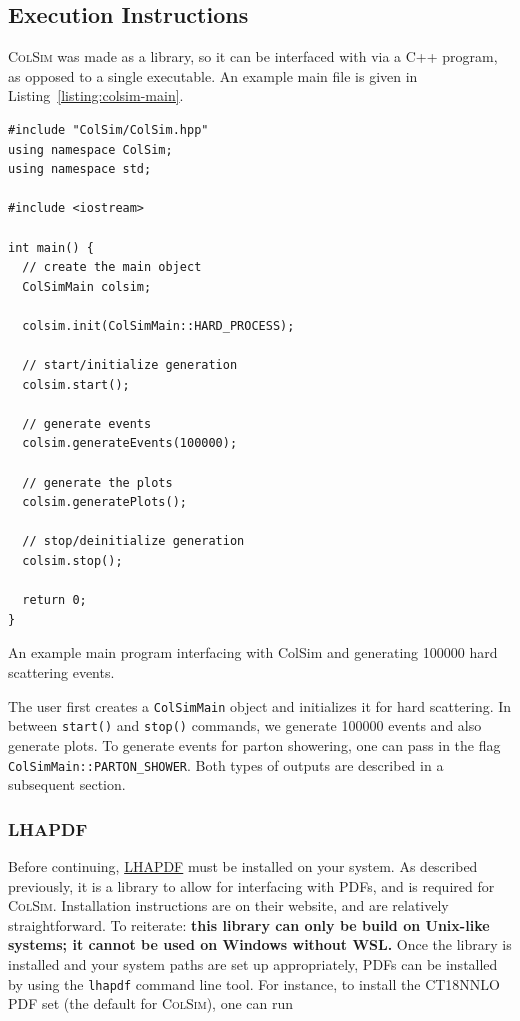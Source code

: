 \subsection{Execution Instructions}

\textsc{ColSim} was made as a library, so it can be interfaced with via a C++ program, as opposed to a single executable. An example main file is given in Listing~\ref{listing:colsim-main}.

\begin{listing}[!ht]
\begin{verbatim}
#include "ColSim/ColSim.hpp"
using namespace ColSim;
using namespace std;

#include <iostream>

int main() {
  // create the main object
  ColSimMain colsim;

  colsim.init(ColSimMain::HARD_PROCESS);

  // start/initialize generation
  colsim.start();

  // generate events
  colsim.generateEvents(100000);
	
  // generate the plots
  colsim.generatePlots();

  // stop/deinitialize generation
  colsim.stop();
    
  return 0;
}
\end{verbatim}
\caption{An example main program interfacing with ColSim and generating 100000 hard scattering events.}
\label{listing:colsim-main}
\end{listing}

The user first creates a \texttt{ColSimMain} object and initializes it for hard scattering. In between \texttt{start()} and \texttt{stop()} commands, we generate 100000 events and also generate plots. To generate events for parton showering, one can pass in the flag \texttt{ColSimMain::PARTON_SHOWER}. Both types of outputs are described in a subsequent section.

\subsubsection{LHAPDF}\label{sec:3-model-lhapdf}

Before continuing, \href{https://www.lhapdf.org/}{LHAPDF} must be installed on your system. As described previously, it is a library to allow for interfacing with PDFs, and is required for \textsc{ColSim}. Installation instructions are on their website, and are relatively straightforward. To reiterate: \textbf{this library can only be build on Unix-like systems; it cannot be used on Windows without WSL.} Once the library is installed and your system paths are set up appropriately, PDFs can be installed by using the \texttt{lhapdf} command line tool. For instance, to install the CT18NNLO PDF set (the default for \textsc{ColSim}), one can run

